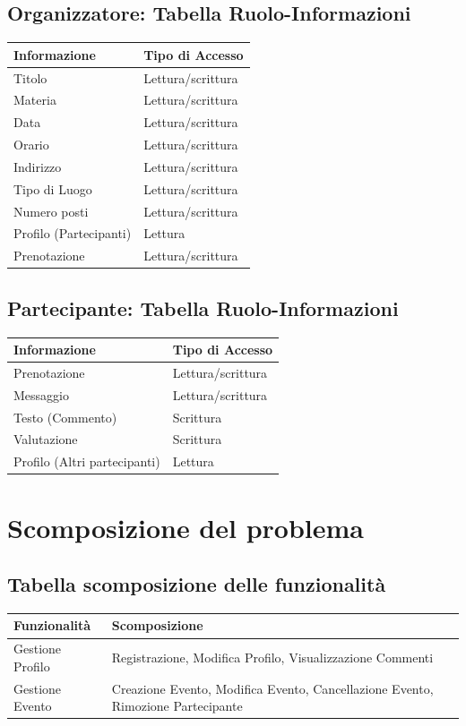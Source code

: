 \documentclass[12pt,a4paper]{report}
\begin{document}
\subsection{Organizzatore: Tabella Ruolo-Informazioni}
\begin{tabularx}{\textwidth}{|X|X|}
    \hline
    \rowcolor{studyColor} \textbf{Informazione} & \textbf{Tipo di Accesso} \\ \hline
    \endhead
    Titolo & Lettura/scrittura \\ \hline
    Materia & Lettura/scrittura \\ \hline
    Data & Lettura/scrittura \\ \hline
    Orario & Lettura/scrittura \\ \hline
    Indirizzo & Lettura/scrittura \\ \hline
    Tipo di Luogo & Lettura/scrittura \\ \hline
    Numero posti & Lettura/scrittura \\ \hline
    Profilo (Partecipanti) & Lettura \\ \hline
    Prenotazione & Lettura/scrittura \\ \hline
\end{tabularx}

\subsection{Partecipante: Tabella Ruolo-Informazioni}
\begin{tabularx}{\textwidth}{|X|X|}
    \hline
    \rowcolor{studyColor} \textbf{Informazione} & \textbf{Tipo di Accesso} \\ \hline
    \endhead
    Prenotazione & Lettura/scrittura \\ \hline
    Messaggio & Lettura/scrittura \\ \hline
    Testo (Commento) & Scrittura \\ \hline
    Valutazione & Scrittura \\ \hline
    Profilo (Altri partecipanti) & Lettura \\ \hline
\end{tabularx}

\newpage
\section{Scomposizione del problema}

\subsection{Tabella scomposizione delle funzionalità}
\begin{tabularx}{\textwidth}{|l|X|}
    \hline
    \rowcolor{studyColor} \textbf{Funzionalità} & \textbf{Scomposizione} \\ \hline
    \endhead
    Gestione Profilo & Registrazione, Modifica Profilo, Visualizzazione Commenti \\ \hline
    Gestione Evento & Creazione Evento, Modifica Evento, Cancellazione Evento, Rimozione Partecipante \\ \hline
\end{tabularx}
\end{document}
